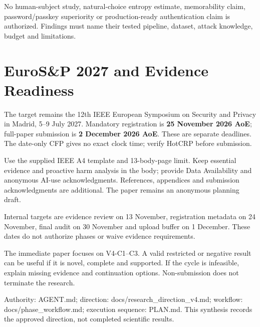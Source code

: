\documentclass[11pt,a4paper]{article}
\begin{document}
No human-subject study, natural-choice entropy estimate, memorability claim, password/passkey superiority or production-ready authentication claim is authorized. Findings must name their tested pipeline, dataset, attack knowledge, budget and limitations.

\section{EuroS\&P 2027 and Evidence Readiness}
The target remains the 12th IEEE European Symposium on Security and Privacy in Madrid, 5--9 July 2027. Mandatory registration is \textbf{25 November 2026 AoE}; full-paper submission is \textbf{2 December 2026 AoE}. These are separate deadlines. The date-only CFP gives no exact clock time; verify HotCRP before submission.

Use the supplied IEEE A4 template and 13-body-page limit. Keep essential evidence and proactive harm analysis in the body; provide Data Availability and anonymous AI-use acknowledgments. References, appendices and submission acknowledgments are additional. The paper remains an anonymous planning draft.

Internal targets are evidence review on 13 November, registration metadata on 24 November, final audit on 30 November and upload buffer on 1 December. These dates do not authorize phases or waive evidence requirements.

The immediate paper focuses on V4-C1--C3. A valid restricted or negative result can be useful if it is novel, complete and supported. If the cycle is infeasible, explain missing evidence and continuation options. Non-submission does not terminate the research.

\vfill
\begin{center}
\small\color{SSGray}
Authority: AGENT.md; direction: docs/research\_direction\_v4.md; workflow: docs/phase\_workflow.md; execution sequence: PLAN.md. This synthesis records the approved direction, not completed scientific results.
\end{center}
\end{document}
